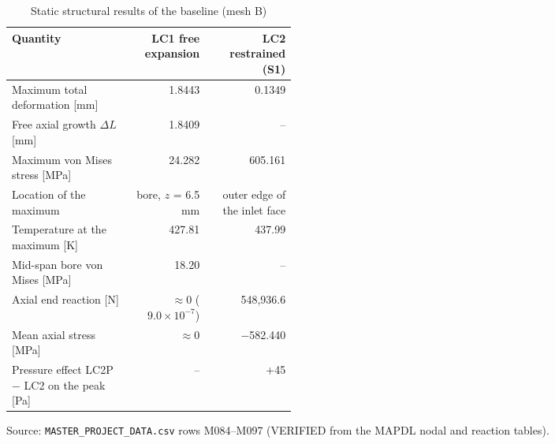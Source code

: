 \begin{table}[htbp]
\centering
\footnotesize
\caption{Static structural results of the baseline (mesh B)}
\label{tab:lcres}
\begin{tabular}{>{\raggedright\arraybackslash}p{0.42\linewidth}rr}
\toprule
Quantity & LC1 free expansion & LC2 restrained (S1) \\
\midrule
Maximum total deformation [mm] & 1.8443 & 0.1349 \\
Free axial growth $\Delta L$ [mm] & 1.8409 & -- \\
Maximum von Mises stress [MPa] & 24.282 & 605.161 \\
Location of the maximum & bore, $z$ = 6.5 mm & outer edge of the inlet face \\
Temperature at the maximum [K] & 427.81 & 437.99 \\
Mid-span bore von Mises [MPa] & 18.20 & -- \\
Axial end reaction [N] & $\approx 0$ ($9.0\times10^{-7}$) & 548,936.6 \\
Mean axial stress [MPa] & $\approx 0$ & $-$582.440 \\
Pressure effect LC2P $-$ LC2 on the peak [Pa] & -- & +45 \\
\bottomrule
\end{tabular}
\par\smallskip\parbox{\linewidth}{\footnotesize\raggedright Source: \texttt{MASTER\_PROJECT\_DATA.csv} rows M084--M097 (VERIFIED from the MAPDL nodal and reaction tables).}
\end{table}
